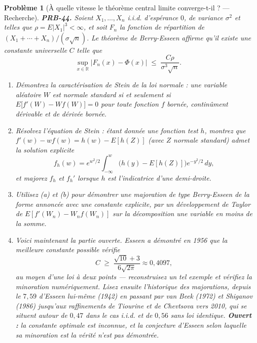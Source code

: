 \documentclass[11pt]{article}
\newtheorem{problem}{Problème}
\begin{document}
\bigskip

\begin{problem}[{À quelle vitesse le théorème central limite converge-t-il ? --- Recherche}]
\textbf{PRB-44.} Soient $ X_1, \dots, X_n $ i.i.d. d'espérance $ 0 $, de variance
$ \sigma^2 $ et telles que $ \rho = E|X_1|^3 < \infty $, et soit $ F_n $ la fonction de
répartition de $ (X_1 + \cdots + X_n)/(\sigma\sqrt{n}) $. Le théorème de Berry-Esseen affirme
qu'il existe une constante universelle $ C $ telle que
\[ \sup_{x \in \mathbb{R}} \big| F_n(x) - \Phi(x) \big| \;\le\; \frac{C \rho}{\sigma^3 \sqrt{n}} . \]
\begin{enumerate}
\item[(a)] Démontrez la caractérisation de Stein de la loi normale : une variable aléatoire $ W $ est
normale standard si et seulement si $ E\big[ f'(W) - W f(W) \big] = 0 $ pour toute fonction
$ f $ bornée, continûment dérivable et de dérivée bornée.
\item[(b)] Résolvez l'équation de Stein : étant donnée une fonction test $ h $, montrez que
$ f'(w) - w f(w) = h(w) - E[h(Z)] $ (avec $ Z $ normale standard) admet la solution explicite
\[ f_h(w) = e^{w^2/2} \int_{-\infty}^{w} \big( h(y) - E[h(Z)] \big) e^{-y^2/2} \, dy , \]
et majorez $ f_h $ et $ f_h' $ lorsque $ h $ est l'indicatrice d'une demi-droite.
\item[(c)] Utilisez (a) et (b) pour démontrer une majoration de type Berry-Esseen de la forme annoncée
avec une constante explicite, par un développement de Taylor de
$ E[f'(W_n) - W_n f(W_n)] $ sur la décomposition \og{} une variable en moins \fg{} de la somme.
\item[(d)] Voici maintenant la partie ouverte. Esseen a démontré en 1956 que la meilleure constante
possible vérifie
\[ C \;\ge\; \frac{\sqrt{10}+3}{6\sqrt{2\pi}} \approx 0{,}4097 , \]
au moyen d'une loi à deux points --- reconstruisez un tel exemple et vérifiez la minoration
numériquement. Lisez ensuite l'historique des majorations, depuis le $ 7{,}59 $ d'Esseen lui-même
(1942) en passant par van Beek (1972) et Shiganov (1986) jusqu'aux raffinements de Tiourine et de
Chevtsova vers 2010, qui se situent autour de $ 0{,}47 $ dans le cas i.i.d. et de $ 0{,}56 $
sans loi identique. \textbf{Ouvert :} la constante optimale est inconnue, et la conjecture d'Esseen
selon laquelle sa minoration est la vérité n'est pas démontrée.
\end{enumerate}

\end{problem}
\end{document}
